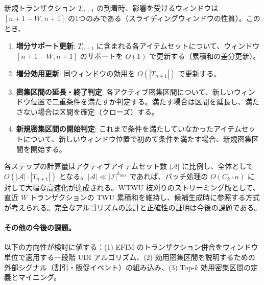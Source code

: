新規トランザクション $T_{n+1}$ の到着時、影響を受けるウィンドウは $[n+1-W, n+1]$ の1つのみである（スライディングウィンドウの性質）。このとき、

\begin{enumerate}
  \item \textbf{増分サポート更新}: $T_{n+1}$ に含まれる各アイテムセットについて、ウィンドウ $[n+1-W, n+1]$ のサポートを $O(1)$ で更新する（累積和の差分更新）。
  \item \textbf{増分効用更新}: 同ウィンドウの効用を $O(|T_{n+1}|)$ で更新する。
  \item \textbf{密集区間の延長・終了判定}: 各アクティブ密集区間について、新しいウィンドウ位置で二重条件を満たすか判定する。満たす場合は区間を延長し、満たさない場合は区間を確定（クローズ）する。
  \item \textbf{新規密集区間の開始判定}: これまで条件を満たしていなかったアイテムセットについて、新しいウィンドウ位置で初めて条件を満たす場合、新規密集区間を開始する。
\end{enumerate}

\noindent
各ステップの計算量はアクティブアイテムセット数 $|\mathcal{A}|$ に比例し、全体として $O(|\mathcal{A}| \cdot |T_{n+1}|)$ となる。$|\mathcal{A}| \ll |\mathcal{I}|^{k_{\max}}$ であれば、バッチ処理の $O(C_k \cdot n)$ に対して大幅な高速化が達成される。WTWU 枝刈りのストリーミング版として、直近 $W$ トランザクションの TWU 累積和を維持し、候補生成時に参照する方式が考えられる。完全なアルゴリズムの設計と正確性の証明は今後の課題である。

\paragraph{その他の今後の課題。}
以下の方向性が検討に値する：(1) EFIM のトランザクション併合をウィンドウ単位で適用する一段階 UDI アルゴリズム、(2) 効用密集区間を説明するための外部シグナル（割引・販促イベント）の組み込み、(3) Top-$k$ 効用密集区間の定義とマイニング。
